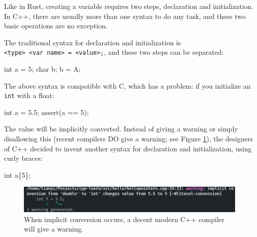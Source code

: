 \documentclass[
]{book}
\newenvironment{Shaded}{\begin{snugshade}}{\end{snugshade}}
\newcommand{\CharTok}[1]{\textcolor[rgb]{0.31,0.60,0.02}{#1}}
\newcommand{\DataTypeTok}[1]{\textcolor[rgb]{0.13,0.29,0.53}{#1}}
\newcommand{\DecValTok}[1]{\textcolor[rgb]{0.00,0.00,0.81}{#1}}
\newcommand{\FloatTok}[1]{\textcolor[rgb]{0.00,0.00,0.81}{#1}}
\newcommand{\NormalTok}[1]{#1}
\newcommand{\OtherTok}[1]{\textcolor[rgb]{0.56,0.35,0.01}{#1}}
\begin{document}
Like in Rust, creating a variable requires two steps, declaration and initialization. In C++, there are usually more than one syntax to do any task, and these two basic operations are no exception.

The traditional syntax for declaration and initialization is \texttt{\textless{}type\textgreater{}\ \textless{}var\ name\textgreater{}\ =\ \textless{}value\textgreater{};}, and these two steps can be separated:

\begin{Shaded}
\begin{Highlighting}[]
\DataTypeTok{int}\NormalTok{ a = }\DecValTok{5}\NormalTok{;}
\DataTypeTok{char}\NormalTok{ b;}
\NormalTok{b = }\CharTok{\textquotesingle{}A\textquotesingle{}}\NormalTok{;}
\end{Highlighting}
\end{Shaded}

The above syntax is compatible with C, which has a problem: if you initialize an \texttt{int} with a float:

\begin{Shaded}
\begin{Highlighting}[]
\DataTypeTok{int}\NormalTok{ a = }\FloatTok{5.5}\NormalTok{;}
\OtherTok{assert}\NormalTok{(a == }\DecValTok{5}\NormalTok{);}
\end{Highlighting}
\end{Shaded}

The value will be implicitly converted. Instead of giving a warning or simply disallowing this (recent compilers DO give a warning; see Figure \ref{fig:equal}), the designers of C++ decided to invent another syntax for declaration and initialization, using curly braces:

\begin{Shaded}
\begin{Highlighting}[]
\DataTypeTok{int}\NormalTok{ a\{}\DecValTok{5}\NormalTok{\};}
\end{Highlighting}
\end{Shaded}

\begin{figure}
\centering
\includegraphics{img/equal.png}
\caption{\label{fig:equal}When implicit conversion occurs, a decent modern C++ compiler will give a warning.}
\end{figure}
\end{document}
